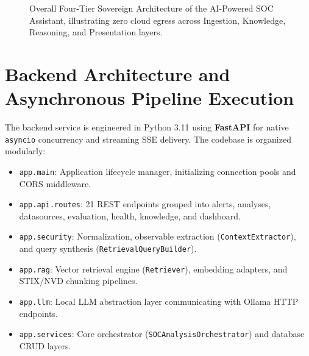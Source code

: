 \begin{figure}[!htbp]
{%
}
\caption{Overall Four-Tier Sovereign Architecture of the AI-Powered SOC Assistant, illustrating zero cloud egress across Ingestion, Knowledge, Reasoning, and Presentation layers.}
\label{fig:architecture_diagram_fig}
\end{figure}

\section{Backend Architecture and Asynchronous Pipeline Execution}
\label{sec:backend_arch}
The backend service is engineered in Python 3.11 using \textbf{FastAPI} for native \texttt{asyncio} concurrency and streaming SSE delivery. The codebase is organized modularly:
\begin{itemize}[itemsep=1pt,topsep=2pt]
  \item \texttt{app.main}: Application lifecycle manager, initializing connection pools and CORS middleware.
  \item \texttt{app.api.routes}: 21 REST endpoints grouped into alerts, analyses, datasources, evaluation, health, knowledge, and dashboard.
  \item \texttt{app.security}: Normalization, observable extraction (\texttt{ContextExtractor}), and query synthesis (\texttt{RetrievalQueryBuilder}).
  \item \texttt{app.rag}: Vector retrieval engine (\texttt{Retriever}), embedding adapters, and STIX/NVD chunking pipelines.
  \item \texttt{app.llm}: Local LLM abstraction layer communicating with Ollama HTTP endpoints.
  \item \texttt{app.services}: Core orchestrator (\texttt{SOCAnalysisOrchestrator}) and database CRUD layers.
\end{itemize}

